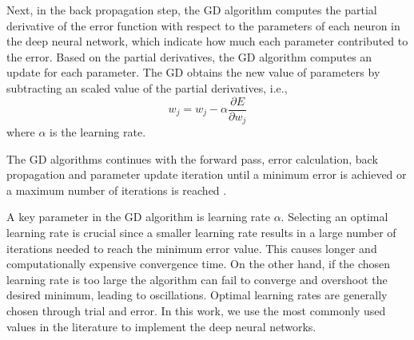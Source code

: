 \documentclass[conference]{IEEEtran}
\begin{document}
Next, in the back propagation step, the GD algorithm 
computes the partial derivative of the error function with respect to the
parameters of each neuron in the deep neural network, which indicate how much each parameter contributed to
the error. Based on the partial derivatives, the GD algorithm computes an update for each parameter. 
The GD  obtains the new value of parameters by subtracting an scaled value of the partial derivatives, i.e.,  
$$w_j = w_j -\alpha \frac{\partial E}{\partial w_j} $$
where  $\alpha$ is the learning rate. 

The GD algorithms continues with the forward pass, error calculation, back propagation and parameter update iteration until a minimum
error is achieved or a maximum number of iterations is reached \cite{ruder2016overview}. 

A key parameter in the GD algorithm is learning rate $\alpha$.   Selecting an optimal learning
rate is crucial since a smaller learning rate results in a large number of iterations needed to reach the minimum error value. This
causes longer and computationally expensive convergence time. On the other hand, if the chosen learning rate is too large the algorithm
can fail to converge and overshoot the desired minimum, leading to oscillations.  Optimal learning rates are generally chosen through
trial and error. In this work, we use the most commonly used values in the literature to implement the deep neural networks. 





\end{document}
